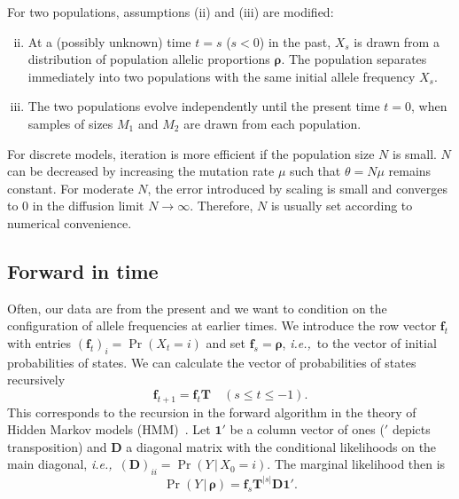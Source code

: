 \documentclass[preprint]{elsarticle}
\newcommand{\bs}[1]{\ensuremath{\boldsymbol{#1}}}
\newcommand\given{{\,|\,}}
\newcommand\eg{{\it e.g.,}}
\newcommand\ie{{\it i.e.,}}
\newcommand\x[1]{\ensuremath{X_{#1}}}
\newcommand\y{\ensuremath{Y}}
\newcommand\s{\ensuremath{s}}
\newcommand\fv[1]{\ensuremath{\mathbf{f}_{#1}}}
\newcommand\oneC{\ensuremath{\mathbf{1}'}}
\begin{document}
For two populations, assumptions (ii) and (iii) are modified:
\begin{enumerate}[(i)]
\setcounter{enumi}{1}
\item At a (possibly unknown) time $t=\s$ ($\s<0$) in the past,  $\x{\s}$ is drawn from a distribution of population allelic proportions $\bs{\rho}$. The population separates immediately into two populations with the same initial allele frequency $\x{\s}$. 
\item The two populations evolve independently until the present time $t=0$, when samples of sizes $M_1$ and $M_2$ are drawn from each population.
\end{enumerate}

For discrete models, iteration is more efficient if the population size $N$ is small. $N$ can be decreased by increasing the mutation rate $\mu$ such that $\theta=N \mu$ remains constant. For moderate $N$, the error introduced by scaling is small and converges to $0$ in the diffusion limit $N \to \infty$. Therefore, $N$ is usually set according to numerical convenience. %


\subsection{Forward in time}

Often, our data are from the present and we want to condition on the configuration of allele frequencies at earlier times.  We introduce the row vector $\fv{t}$ with entries $(\fv{t})_{i} = \Pr(X_{t} = i)$ and set $\fv{\s} = \bs{\rho}$, \ie\ to the vector of initial probabilities of states. We can calculate the vector of probabilities of states recursively 
\begin{equation}
\fv{t+1} = \fv{t}\mathbf{T} \quad (\s \le t \le -1).
\end{equation}
This corresponds to the recursion in the forward algorithm in the theory of Hidden Markov models (HMM)~\citep[\eg][]{Vogl10}. Let $\oneC$ be a column vector of ones ($'$ depicts transposition) and $\mathbf{D}$ a diagonal matrix with the conditional likelihoods on the main diagonal, \ie\ $(\mathbf{D})_{ii}=\Pr(\y \given \x{0}=i)$. The marginal likelihood then is
\begin{equation}
\Pr(\y \given \bs{\rho}) = \fv{\s}\mathbf{T}^{|\s|}\mathbf{D}\oneC.
\end{equation}
\end{document}
